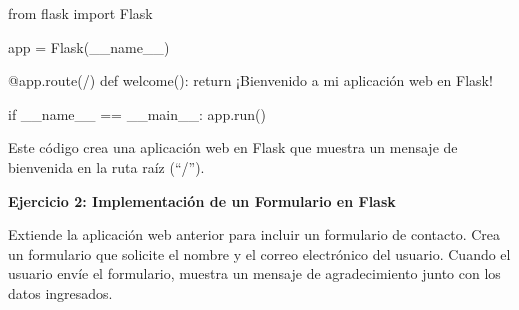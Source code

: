 \documentclass[
  a4paper,
  DIV=11,
  numbers=noendperiod,
  onepage,
  openany]{scrreprt}
\newenvironment{Shaded}{\begin{snugshade}}{\end{snugshade}}
\newcommand{\AttributeTok}[1]{\textcolor[rgb]{0.40,0.45,0.13}{#1}}
\newcommand{\ControlFlowTok}[1]{\textcolor[rgb]{0.00,0.23,0.31}{#1}}
\newcommand{\ImportTok}[1]{\textcolor[rgb]{0.00,0.46,0.62}{#1}}
\newcommand{\KeywordTok}[1]{\textcolor[rgb]{0.00,0.23,0.31}{#1}}
\newcommand{\NormalTok}[1]{\textcolor[rgb]{0.00,0.23,0.31}{#1}}
\newcommand{\OperatorTok}[1]{\textcolor[rgb]{0.37,0.37,0.37}{#1}}
\newcommand{\StringTok}[1]{\textcolor[rgb]{0.13,0.47,0.30}{#1}}
\newcommand{\VariableTok}[1]{\textcolor[rgb]{0.07,0.07,0.07}{#1}}
\begin{document}
\begin{Shaded}
\begin{Highlighting}[]
\ImportTok{from}\NormalTok{ flask }\ImportTok{import}\NormalTok{ Flask}

\NormalTok{app }\OperatorTok{=}\NormalTok{ Flask(}\VariableTok{\_\_name\_\_}\NormalTok{)}

\AttributeTok{@app.route}\NormalTok{(}\StringTok{\textquotesingle{}/\textquotesingle{}}\NormalTok{)}
\KeywordTok{def}\NormalTok{ welcome():}
    \ControlFlowTok{return} \StringTok{\textquotesingle{}¡Bienvenido a mi aplicación web en Flask!\textquotesingle{}}

\ControlFlowTok{if} \VariableTok{\_\_name\_\_} \OperatorTok{==} \StringTok{\textquotesingle{}\_\_main\_\_\textquotesingle{}}\NormalTok{:}
\NormalTok{    app.run()}
\end{Highlighting}
\end{Shaded}

Este código crea una aplicación web en Flask que muestra un mensaje de
bienvenida en la ruta raíz (``/'').

\textbf{Ejercicio 2: Implementación de un Formulario en Flask}

Extiende la aplicación web anterior para incluir un formulario de
contacto. Crea un formulario que solicite el nombre y el correo
electrónico del usuario. Cuando el usuario envíe el formulario, muestra
un mensaje de agradecimiento junto con los datos ingresados.
\end{document}
